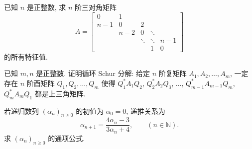 \begin{problem}[选做]
已知 $n$ 是正整数, 求 $n$ 阶三对角矩阵
\[
    A=
    \begin{bmatrix}
        0 & 1 &  &  &  \\
        n-1 & 0 & 2 &  &  \\
         & n-2 & 0 & \ddots &  \\
         &  & \ddots & \ddots & n-1 \\
         &  &  & 1 & 0
    \end{bmatrix}
\]
的所有特征值.
\begin{solution}

\end{solution}
\end{problem}

\begin{problem}[选做]
已知 $m,n$ 是正整数. 证明循环 Schur 分解: 给定 $n$ 阶复矩阵 $A_1,A_2,\ldots,A_m$, 一定存在 $n$ 阶酉矩阵 $Q_1,Q_2,\ldots,Q_m$ 使得 $Q_1^*A_1Q_2$, $Q_2^*A_2Q_3$, $\ldots$, $Q_{m-1}^*A_{m-1}Q_m$, $Q_m^*A_mQ_1$ 都是上三角矩阵.
\begin{solution}

\end{solution}
\end{problem}

\begin{problem}[选做]
若递归数列 $(\alpha_n)_{n\geq 0}$ 的初值为 $\alpha_0=0$, 递推关系为
\[
    \alpha_{n+1}=\frac{4\alpha_n-3}{3\alpha_n+4}, \qquad (n\in\mathbb{N}).
\]
求 $(\alpha_n)_{n\geq 0}$ 的通项公式.
\begin{solution}

\end{solution}
\end{problem}
